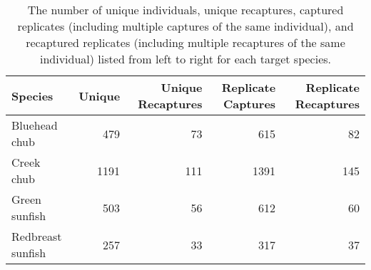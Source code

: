 \begin{table}[ht]
\centering
\caption{The number of unique individuals, unique recaptures, captured replicates (including multiple captures of the same individual), and recaptured replicates (including multiple recaptures of the same individual) listed from left to right for each target species.} 
\label{tab:capture}
\begin{tabular}{lrrrr}
  \hline
Species & Unique & Unique Recaptures & Replicate Captures & Replicate Recaptures \\ 
  \hline
Bluehead chub & 479 &  73 & 615 &  82 \\ 
  Creek chub & 1191 & 111 & 1391 & 145 \\ 
  Green sunfish & 503 &  56 & 612 &  60 \\ 
  Redbreast sunfish & 257 &  33 & 317 &  37 \\ 
   \hline
\end{tabular}
\end{table}
